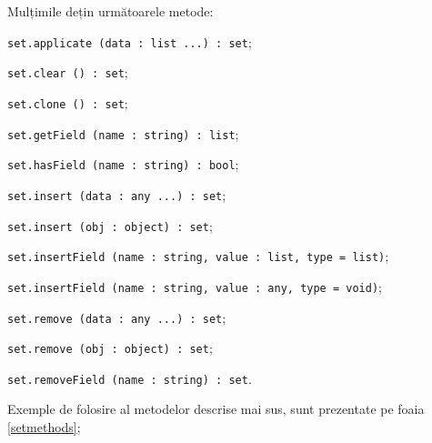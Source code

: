 Mulțimile dețin următoarele metode:
\begin{icItems}
\item \lstinline|set.applicate (data : list ...) : set|;
\item \lstinline|set.clear () : set|;
\item \lstinline|set.clone () : set|;
\item \lstinline|set.getField (name : string) : list|;
\item \lstinline|set.hasField (name : string) : bool|;
\item \lstinline|set.insert (data : any ...) : set|;
\item \lstinline|set.insert (obj : object) : set|;
\item \lstinline|set.insertField (name : string, value : list, type = list)|;
\item \lstinline|set.insertField (name : string, value : any, type = void)|;
\item \lstinline|set.remove (data : any ...) : set|;
\item \lstinline|set.remove (obj : object) : set|;
\item \lstinline|set.removeField (name : string) : set|.
\end{icItems}

Exemple de folosire al metodelor descrise mai sus, sunt prezentate pe foaia \ref{setmethods};

